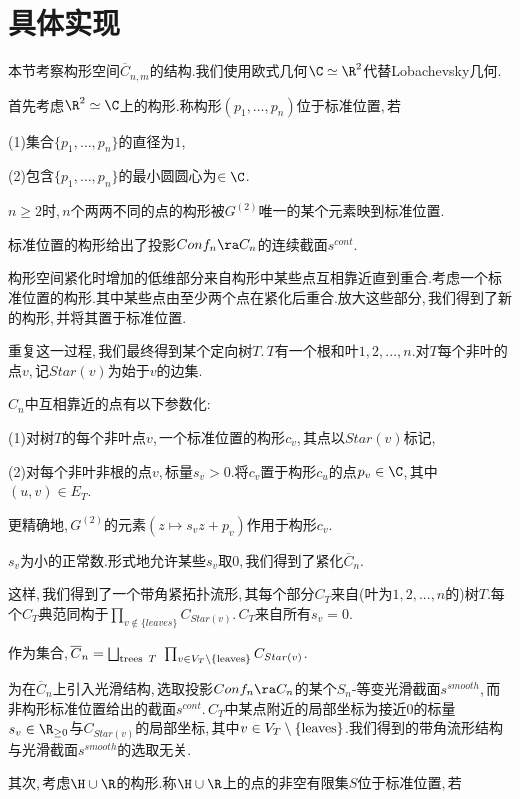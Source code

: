 \section{具体实现}

本节考察构形空间${\overline C}_{n,m}$的结构.我们使用欧式几何$\C\simeq \R^2$代替Lobachevsky几何.

首先考虑$\R^2\simeq \C$上的构形.称构形$(p_1,\dots,p_n)$位于标准位置,\,若

(1)集合$\{p_1,\dots,p_n\}$的直径为$1$,\,

(2)包含$\{p_1,\dots,p_n\}$的最小圆圆心为$\in \C$.

$n\ge 2$时,\,$n$个两两不同的点的构形被$G^{(2)}$唯一的某个元素映到标准位置.

标准位置的构形给出了投影$Conf_n\ra C_n$的连续截面$s^{cont}$.

构形空间紧化时增加的低维部分来自构形中某些点互相靠近直到重合.考虑一个标准位置的构形.其中某些点由至少两个点在紧化后重合.放大这些部分,\,我们得到了新的构形,\,并将其置于标准位置.

重复这一过程,\,我们最终得到某个定向树$T$.\,$T$有一个根和叶$1,2,...,n$.对$T$每个非叶的点$v$,\,记$Star(v)$为始于$v$的边集.

$C_n$中互相靠近的点有以下参数化:\,

(1)对树$T$的每个非叶点$v$,\,一个标准位置的构形$c_v$,\,其点以$Star(v)$标记,\,

(2)对每个非叶非根的点$v$,\,标量$s_v>0$.将$c_v$置于构形$c_u$的点$p_v\in \C$,\,其中$(u,v)\in E_T$.

更精确地,\,$G^{(2)}$的元素$(z\mapsto s_v z+p_v)$作用于构形$c_v$.

$s_v$为小的正常数.形式地允许某些$s_v$取$0$,\,我们得到了紧化$\overline{C}_n$.

这样,\,我们得到了一个带角紧拓扑流形,\,其每个部分$C_T$来自(叶为$1,2,...,n$的)树$T$.每个$C_T$典范同构于$\prod_{v\notin \{leaves\}} C_{Star(v)}$.\,$C_T$来自所有$s_v=0$.

作为集合,\,$\overline{C}_n=\bigsqcup_{{\rm trees}\,\,\,T}\,\, \prod_{v\in V_T\setminus
              \{\rm leaves\}} C_{Star(v)}$.

为在$\overline{C}_n$上引入光滑结构,\,选取投影$Conf_n\ra C_n$的某个$S_n$-等变光滑截面$s^{smooth}$,\,而非构形标准位置给出的截面$s^{cont}$.\,$C_T$中某点附近的局部坐标为接近$0$的标量$s_v\in\R_{\ge 0}$与$C_{Star(v)}$的局部坐标,\,其中$v\in V_T\setminus
              \{\rm leaves\}$.我们得到的带角流形结构与光滑截面$s^{smooth}$的选取无关.

其次,\,考虑$\H\cup \R$的构形.称$\H\cup\R$上的点的非空有限集$S$位于标准位置,\,若

